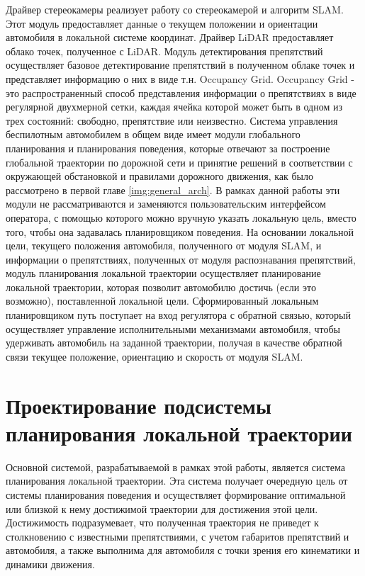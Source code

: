 Драйвер стереокамеры реализует работу со стереокамерой и алгоритм SLAM. Этот модуль предоставляет данные о текущем
положении и ориентации автомобиля в локальной системе координат. Драйвер LiDAR предоставляет облако точек, полученное
с LiDAR. Модуль детектирования препятствий осуществляет базовое детектирование препятствий в полученном облаке точек
и представляет информацию о них в виде т.н. Occupancy Grid. Occupancy Grid - это распространенный способ представления
информации о препятствиях в виде регулярной двухмерной сетки, каждая ячейка которой может быть в одном из трех
состояний: свободно, препятствие или неизвестно. Система управления беспилотным автомобилем в общем виде имеет модули
глобального планирования и планирования поведения, которые отвечают за построение глобальной траектории по дорожной
сети и принятие решений в соответствии с окружающей обстановкой и правилами дорожного движения, как было рассмотрено
в первой главе \ref{img:general_arch}. В рамках данной работы эти модули не рассматриваются и заменяются пользовательским
интерфейсом оператора, с помощью которого можно вручную указать локальную цель, вместо того, чтобы она задавалась
планировщиком поведения. На основании локальной цели, текущего положения автомобиля, полученного от модуля SLAM, и
информации о препятствиях, полученных от модуля распознавания препятствий, модуль планирования локальной траектории
осуществляет планирование локальной траектории, которая позволит автомобилю достичь (если это возможно), поставленной
локальной цели. Сформированный локальным планировщиком путь поступает на вход регулятора с обратной связью, который
осуществляет управление исполнительными механизмами автомобиля, чтобы удерживать автомобиль на заданной траектории,
получая в качестве обратной связи текущее положение, ориентацию и скорость от модуля SLAM.

\section{Проектирование подсистемы планирования локальной траектории}
Основной системой, разрабатываемой в рамках этой работы, является система планирования локальной траектории. Эта система
получает очередную цель от системы планирования поведения и осуществляет формирование оптимальной или близкой к нему
достижимой траектории для достижения этой цели. Достижимость подразумевает, что полученная траектория не приведет к
столкновению с известными препятствиями, с учетом габаритов препятствий и автомобиля, а также выполнима для автомобиля
с точки зрения его кинематики и динамики движения.

